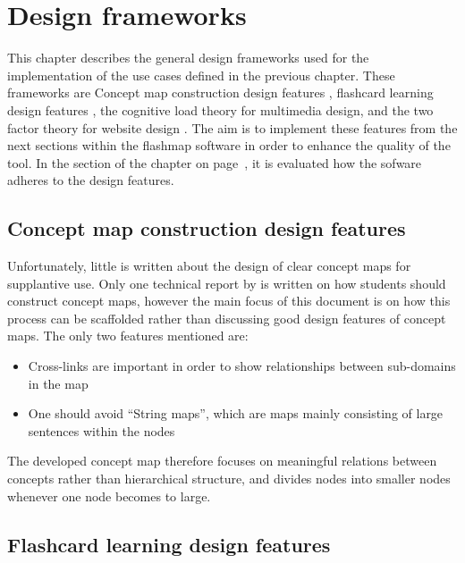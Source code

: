 \chapter{Design frameworks}
\label{ch:frameworks}

This chapter describes the general design frameworks used for the implementation of the use cases defined in the previous chapter. These frameworks are Concept map construction design features \cite{constructcmaps}, flashcard learning design features \cite{nakata}, the cognitive load theory \cite{cognitiveload} for multimedia design, and the two factor theory for website design \cite{websitedesign}. The aim is to implement these features from the next sections within the flashmap software in order to enhance the quality of the tool. In the  section of the  chapter on page~\pageref{sec:screening}, it is evaluated how the sofware adheres to the design features.

    \section{Concept map construction design features}

Unfortunately, little is written about the design of clear concept maps for supplantive use. Only one technical report by \cite{constructcmaps} is written on how students should construct concept maps, however the main focus of this document is on how this process can be scaffolded rather than discussing good design features of concept maps. The only two features mentioned are:

\begin{itemize}
    \item Cross-links are important in order to show relationships between sub-domains in the map
    \item One should avoid ``String maps'', which are maps mainly consisting of large sentences within the nodes
\end{itemize}

The developed concept map therefore focuses on meaningful relations between concepts rather than hierarchical structure, and divides nodes into smaller nodes whenever one node becomes to large.


    \section{Flashcard learning design features}

